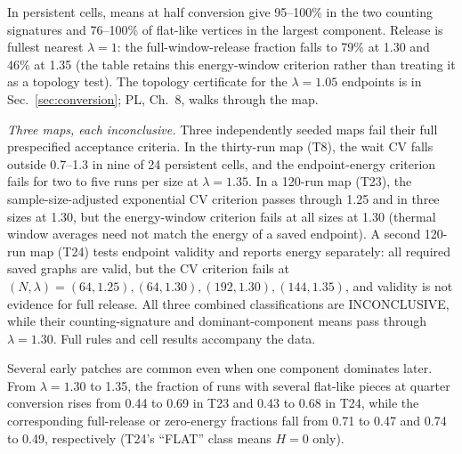 \documentclass[aps,pre,10pt,twocolumn,superscriptaddress,nofootinbib]{revtex4-2}
\begin{document}
In persistent cells, means at half conversion give 95--100\% in the two counting signatures and 76--100\% of flat-like vertices in the
largest component. Release is fullest nearest $\lambda=1$: the full-window-release fraction falls to 79\%
at 1.30 and 46\% at 1.35 (the table retains this energy-window criterion rather than treating it as a
topology test). The topology certificate for the $\lambda=1.05$ endpoints is in
Sec.~\ref{sec:conversion}; PL, Ch.~8, walks through the map.

\emph{Three maps, each inconclusive.} Three independently seeded maps fail their full prespecified
acceptance criteria. In the thirty-run map (T8), the wait CV falls outside 0.7--1.3 in nine of 24
persistent cells, and the endpoint-energy criterion fails for two to five runs per size at
$\lambda=1.35$. In a 120-run map (T23), the sample-size-adjusted exponential CV criterion passes
through 1.25 and in three sizes at 1.30, but the energy-window criterion fails at all sizes at 1.30
(thermal window averages need not match the energy of a saved endpoint). A second 120-run map (T24)
tests endpoint validity and reports energy separately: all required saved graphs are valid, but the CV
criterion fails at $(N,\lambda)=(64,1.25),(64,1.30),(192,1.30),(144,1.35)$, and validity is not
evidence for full release. All three combined classifications are INCONCLUSIVE, while their
counting-signature and dominant-component means pass through $\lambda=1.30$. Full rules and cell
results accompany the data.

Several early patches are common even when one component dominates later. From $\lambda=1.30$ to
1.35, the fraction of runs with several flat-like pieces at quarter conversion rises from 0.44 to 0.69
in T23 and 0.43 to 0.68 in T24, while the corresponding full-release or zero-energy fractions fall
from 0.71 to 0.47 and 0.74 to 0.49, respectively (T24's ``FLAT'' class means $H=0$ only).
\end{document}
